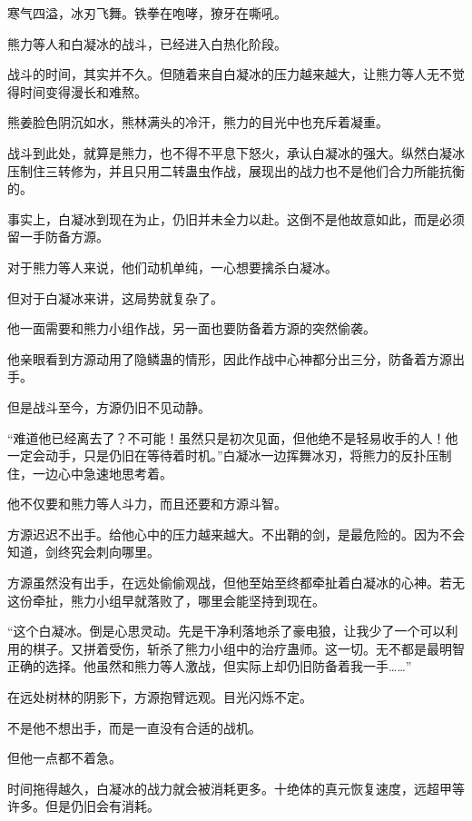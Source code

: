 
\begin{this_body}



寒气四溢，冰刃飞舞。铁拳在咆哮，獠牙在嘶吼。

熊力等人和白凝冰的战斗，已经进入白热化阶段。

战斗的时间，其实并不久。但随着来自白凝冰的压力越来越大，让熊力等人无不觉得时间变得漫长和难熬。

熊姜脸色阴沉如水，熊林满头的冷汗，熊力的目光中也充斥着凝重。

战斗到此处，就算是熊力，也不得不平息下怒火，承认白凝冰的强大。纵然白凝冰压制住三转修为，并且只用二转蛊虫作战，展现出的战力也不是他们合力所能抗衡的。

事实上，白凝冰到现在为止，仍旧并未全力以赴。这倒不是他故意如此，而是必须留一手防备方源。

对于熊力等人来说，他们动机单纯，一心想要擒杀白凝冰。

但对于白凝冰来讲，这局势就复杂了。

他一面需要和熊力小组作战，另一面也要防备着方源的突然偷袭。

他亲眼看到方源动用了隐鳞蛊的情形，因此作战中心神都分出三分，防备着方源出手。

但是战斗至今，方源仍旧不见动静。

“难道他已经离去了？不可能！虽然只是初次见面，但他绝不是轻易收手的人！他一定会动手，只是仍旧在等待着时机。”白凝冰一边挥舞冰刃，将熊力的反扑压制住，一边心中急速地思考着。

他不仅要和熊力等人斗力，而且还要和方源斗智。

方源迟迟不出手。给他心中的压力越来越大。不出鞘的剑，是最危险的。因为不会知道，剑终究会刺向哪里。

方源虽然没有出手，在远处偷偷观战，但他至始至终都牵扯着白凝冰的心神。若无这份牵扯，熊力小组早就落败了，哪里会能坚持到现在。

“这个白凝冰。倒是心思灵动。先是干净利落地杀了豪电狼，让我少了一个可以利用的棋子。又拼着受伤，斩杀了熊力小组中的治疗蛊师。这一切。无不都是最明智正确的选择。他虽然和熊力等人激战，但实际上却仍旧防备着我一手……”

在远处树林的阴影下，方源抱臂远观。目光闪烁不定。

不是他不想出手，而是一直没有合适的战机。

但他一点都不着急。

时间拖得越久，白凝冰的战力就会被消耗更多。十绝体的真元恢复速度，远超甲等许多。但是仍旧会有消耗。


\end{this_body}
